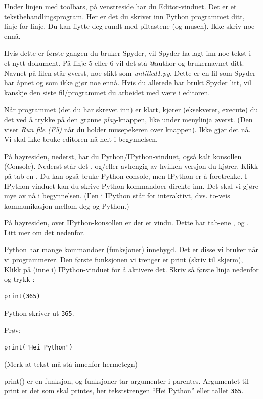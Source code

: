 Under linjen med toolbars, på venstreside har du Editor-vinduet. Det er et tekstbehandlingsprogram.  Her er det du skriver inn Python programmet ditt, linje for linje. Du kan flytte deg rundt med piltastene (og musen). Ikke skriv noe ennå. 

Hvis dette er første gangen du bruker Spyder, vil Spyder ha lagt inn noe tekst i et nytt dokument. På linje 5 eller 6 vil det stå @author og brukernavnet ditt. Navnet på filen står øverst, noe slikt som \emph{untitled1.py}. Dette er en fil som Spyder har åpnet og som ikke gjør noe ennå. Hvis du allerede har brukt Spyder litt, vil kanskje den siste fil/programmet du arbeidet med være i editoren.

Når programmet (det du har skrevet inn) er klart, kjører (eksekverer, execute) du det ved å trykke på den grønne \emph{play}-knappen, like under menylinja øverst. (Den viser \emph{Run file (F5)} når du holder musepekeren over knappen). Ikke gjør det nå. Vi skal ikke bruke editoren nå helt i begynnelsen.

På høyresiden, nederst, har du Python/IPython-vinduet, også kalt konsollen (Console). Nederst står det ,  og/eller  avhengig av hvilken versjon du kjører. Klikk på tab-en . Du kan også bruke Python console, men IPython er å foretrekke. I IPython-vinduet kan du skrive Python kommandoer direkte inn. Det skal vi gjøre mye av nå i begynnelsen. (I'en i IPython står for interaktivt, dvs. to-veis kommunikasjon mellom deg og Python.) 

På høyresiden, over IPython-konsollen er der et vindu. Dette har tab-ene ,  og . Litt mer om det nedenfor. 

Python har mange kommandoer (funksjoner) innebygd. Det er disse vi bruker når vi programmerer. Den første funksjonen vi trenger er print (skriv til skjerm), Klikk på (inne i) IPython-vinduet for å aktivere det. Skriv så første linja nedenfor og trykk  :
\begin{lstlisting}
print(365)
\end{lstlisting}
Python skriver ut \verb|365|.

Prøv:
\begin{lstlisting}
print("Hei Python")
\end{lstlisting}

(Merk at tekst må stå innenfor hermetegn)

print() er en funksjon, og funksjoner tar argumenter i parentes. Argumentet til print er det som skal printes, her tekststrengen ``Hei Python'' eller tallet \verb|365|.

